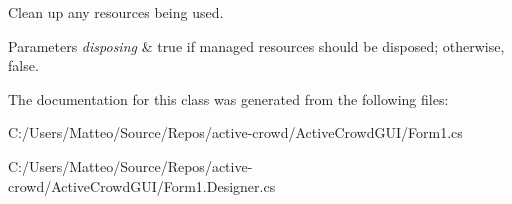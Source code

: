 Clean up any resources being used. 


\begin{DoxyParams}{Parameters}
{\em disposing} & true if managed resources should be disposed; otherwise, false.\\
\hline
\end{DoxyParams}


The documentation for this class was generated from the following files\+:\begin{DoxyCompactItemize}
\item 
C\+:/\+Users/\+Matteo/\+Source/\+Repos/active-\/crowd/\+Active\+Crowd\+G\+U\+I/Form1.\+cs\item 
C\+:/\+Users/\+Matteo/\+Source/\+Repos/active-\/crowd/\+Active\+Crowd\+G\+U\+I/Form1.\+Designer.\+cs\end{DoxyCompactItemize}

